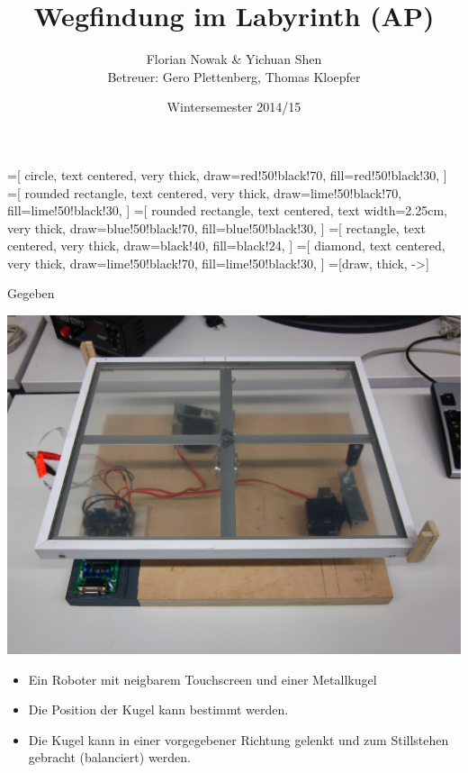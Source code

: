 \documentclass{beamer}
\title{Wegfindung im Labyrinth (AP)}
\author{\texorpdfstring{Florian Nowak \& Yichuan Shen\\ Betreuer: Gero Plettenberg, Thomas Kloepfer}{Florian Nowak \& Yichuan Shen}}
\date{Wintersemester 2014/15}
\begin{document}
\maketitle

=[
  circle,
  text centered,
  very thick,
  draw=red!50!black!70,
  fill=red!50!black!30,
  ]
=[
  rounded rectangle,
  text centered,
  very thick,
  draw=lime!50!black!70,
  fill=lime!50!black!30,
  ]
=[
  rounded rectangle,
  text centered,
  text width=2.25cm,
  very thick,
  draw=blue!50!black!70,
  fill=blue!50!black!30,
  ]
=[
  rectangle,
  text centered,
  very thick,
  draw=black!40,
  fill=black!24,
  ]
=[
  diamond,
  text centered,
  very thick,
  draw=lime!50!black!70,
  fill=lime!50!black!30,
  ]
=[draw, thick, ->]

\begin{frame}[fragile,t]{Gegeben}
\begin{center}
\includegraphics[scale=.13]{roboter_no-maze}
\end{center}
\begin{itemize}[<+->]
\item Ein Roboter mit neigbarem Touchscreen und einer Metallkugel
\item Die Position der Kugel kann bestimmt werden.
\item Die Kugel kann in einer vorgegebener Richtung gelenkt und zum Stillstehen gebracht (balanciert) werden.
\end{itemize}
\end{frame}
\end{document}
